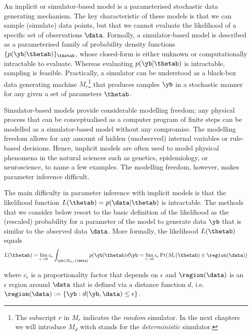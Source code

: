 An implicit or simulator-based model is a parameterised stochastic
data generating mechanism. The key characteristic
of these models is that we can sample (simulate) data points,
but that we cannot evaluate the likelihood of a specific set of observations
$\data$. Formally, a simulator-based model is described as a
parameterised family of probability density functions
$\{ p(\yb|\thetab) \}_{\thetab}$, whose closed-form is either
unknown or computationally intractable to evaluate. Whereas evaluating
$p(\yb|\thetab)$ is intractable, sampling is
feasible. Practically, a simulator can be understood as a black-box
data generating machine $M_r$\footnote{The subscript $r$ in $M_r$ indicates the
  \textit{random} simulator. In the next chapters we will introduce
  $M_d$ witch stands for the \textit{deterministic} simulator.} that
produces samples $\yb$ in a stochastic manner for any given a set of parameters $\thetab$.%

Simulator-based models provide considerable modelling freedom; any physical process that can be
conceptualised as a computer program of finite steps can be modelled
as a simulator-based model without any compromise. The modelling
freedom allows for any amount of hidden (unobserved) internal variables
or rule-based decisions. Hence, implicit models are often used to
model physical phenomena in the natural sciences such as genetics, epidemiology, or neuroscience, to name a few examples.
The modelling freedom, however, makes parameter inference difficult.

The main difficulty in parameter inference with implicit models is that the likelihood function
$L(\thetab) = p(\data|\thetab)$ is intractable. The methods that we consider below resort to the basic definition of the likelihood as the (rescaled) probability for a parameter of the model to generate data $\yb$ that is similar to the observed data $\data$. More formally, the likelihood $L(\thetab)$ equals
\begin{equation} \label{eq:likelihood}
  L(\thetab) = \lim_{\epsilon \to 0} c_\epsilon \int_{\yb \in B_{d,\epsilon}(\data)} p(\yb|\thetab)d\yb =
  \lim_{\epsilon \to 0} c_\epsilon \Pr(M_r(\thetab) \in \region(\data))
\end{equation}
%

where $c_\epsilon$ is a proportionality factor that depends on
$\epsilon$ and $\region(\data)$ is an $\epsilon$ region around $\data$ that is defined via a distance function $d$, i.e.\ $\region(\data) := \{\yb: d(\yb, \data) \leq \epsilon \}$. 


